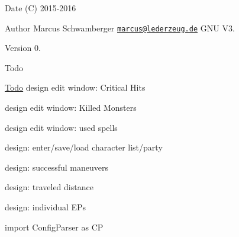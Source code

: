 \begin{DoxyDate}{Date}
(C) 2015-\/2016 
\end{DoxyDate}
\begin{DoxyAuthor}{Author}
Marcus Schwamberger  \href{mailto:marcus@lederzeug.de}{\tt marcus@lederzeug.\+de}  G\+NU V3. 
\end{DoxyAuthor}
\begin{DoxyVersion}{Version}
0.
\end{DoxyVersion}
\begin{DoxyRefDesc}{Todo}
\item[\hyperlink{todo__todo000002}{Todo}]design edit window\+: Critical Hits 

design edit window\+: Killed Monsters 

design edit window\+: used spells 

design\+: enter/save/load character list/party 

design\+: successful maneuvers 

design\+: traveled distance 

design\+: individual E\+Ps\end{DoxyRefDesc}


import Config\+Parser as CP 